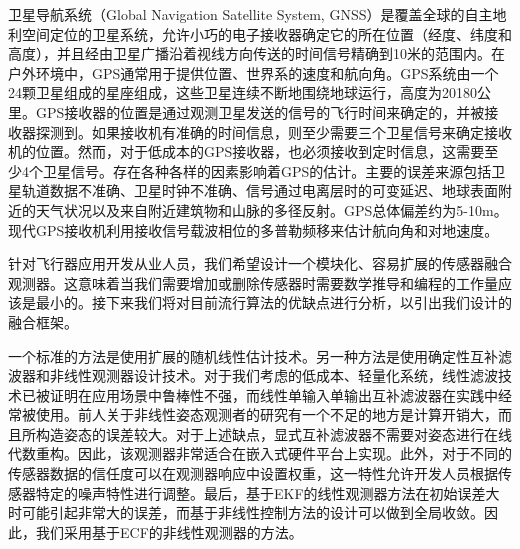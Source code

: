 \documentclass[
  type=master
]{gdutthesis}
\begin{document}
卫星导航系统（Global Navigation Satellite System, GNSS）是覆盖全球的自主地利空间定位的卫星系统，允许小巧的电子接收器确定它的所在位置（经度、纬度和高度），并且经由卫星广播沿着视线方向传送的时间信号精确到10米的范围内。在户外环境中，GPS通常用于提供位置、世界系的速度和航向角。GPS系统由一个24颗卫星组成的星座组成，这些卫星连续不断地围绕地球运行，高度为20180公里。GPS接收器的位置是通过观测卫星发送的信号的飞行时间来确定的，并被接收器探测到。如果接收机有准确的时间信息，则至少需要三个卫星信号来确定接收机的位置。然而，对于低成本的GPS接收器，也必须接收到定时信息，这需要至少4个卫星信号。存在各种各样的因素影响着GPS的估计。主要的误差来源包括卫星轨道数据不准确、卫星时钟不准确、信号通过电离层时的可变延迟、地球表面附近的天气状况以及来自附近建筑物和山脉的多径反射。GPS总体偏差约为5-10m。现代GPS接收机利用接收信号载波相位的多普勒频移来估计航向角和对地速度\cite{wendel2006integrated}。

针对飞行器应用开发从业人员，我们希望设计一个模块化、容易扩展的传感器融合观测器。这意味着当我们需要增加或删除传感器时需要数学推导和编程的工作量应该是最小的。接下来我们将对目前流行算法的优缺点进行分析，以引出我们设计的融合框架。\par
一个标准的方法是使用扩展的随机线性估计技术\cite{lefferts1982kalman,barshan1995inertial}。另一种方法是使用确定性互补滤波器和非线性观测器设计技术\cite{zimmermann1992high,baerveldt1997low,vik2001nonlinear}。对于我们考虑的低成本、轻量化系统，线性滤波技术已被证明在应用场景中鲁棒性不强\cite{roberts2003low}，而线性单输入单输出互补滤波器在实践中经常被使用\cite{saripalli2003tale,corke2004inertial}。前人关于非线性姿态观测者的研究有一个不足的地方是计算开销大，而且所构造姿态的误差较大。对于上述缺点，显式互补滤波器不需要对姿态进行在线代数重构。因此，该观测器非常适合在嵌入式硬件平台上实现。此外，对于不同的传感器数据的信任度可以在观测器响应中设置权重，这一特性允许开发人员根据传感器特定的噪声特性进行调整。最后，基于EKF的线性观测器方法在初始误差大时可能引起非常大的误差，而基于非线性控制方法的设计可以做到全局收敛。因此，我们采用基于ECF的非线性观测器的方法\cite{mahony2008nonlinear}。\par
\end{document}

